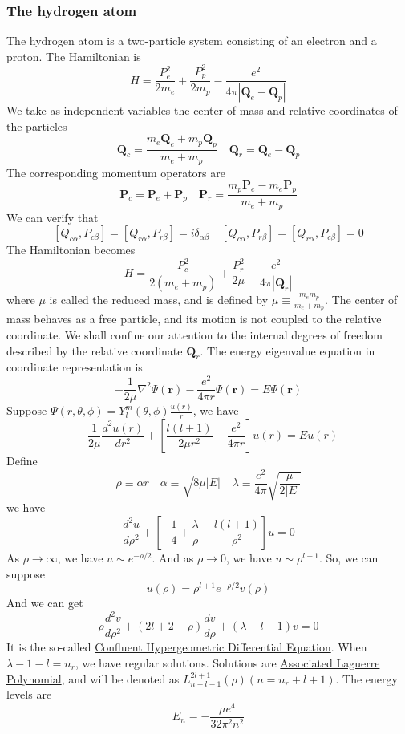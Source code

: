 \subsubsection{The hydrogen atom}
The hydrogen atom is a two-particle system consisting of an electron and a proton. The Hamiltonian is
\[H = \frac{P_e^2}{2m_e} + \frac{P_p^2}{2m_p} - \frac{e^2}{4\pi|\bm{Q}_e-\bm{Q}_p|}\]
We take as independent variables the center of mass and relative coordinates of the particles
\[\bm{Q}_c = \frac{m_e\bm{Q}_e + m_p\bm{Q}_p}{m_e+m_p} \quad \bm{Q}_r = \bm{Q}_e-\bm{Q}_p\]
The corresponding momentum operators are
\[\bm{P}_c = \bm{P}_e + \bm{P}_p \quad \bm{P}_r = \frac{m_p\bm{P}_e-m_e\bm{P}_p}{m_e + m_p}\]
We can verify that
\[[Q_{c\alpha},P_{c\beta}] = [Q_{r\alpha},P_{r\beta}] = i\delta_{\alpha\beta} \quad [Q_{c\alpha},P_{r\beta}] = [Q_{r\alpha},P_{c\beta}] = 0\]
The Hamiltonian becomes
\[H = \frac{P_c^2}{2(m_e+m_p)} + \frac{P_r^2}{2\mu} - \frac{e^2}{4\pi|\bm{Q}_r|}\]
where $\mu$ is called the reduced mass, and is defined by $\mu \equiv \frac{m_em_p}{m_e+m_p}$.
The center of mass behaves as a free particle, and its
motion is not coupled to the relative coordinate. We shall confine our attention to the internal degrees of freedom described by the relative coordinate $\bm{Q}_r$. The energy eigenvalue equation in coordinate representation is
\[-\frac{1}{2\mu}\nabla^2 \Psi(\bm{r})  -\frac{e^2}{4\pi r} \Psi(\bm{r}) = E\Psi(\bm{r})\]
Suppose $\Psi(r,\theta,\phi) = Y_l^m(\theta,\phi) \frac{u(r)}{r}$, we have
\[-\frac{1}{2\mu} \frac{d^2 u(r)}{dr^2} + \left[ \frac{l(l+1)}{2\mu r^2} - \frac{e^2}{4\pi r}\right]u(r) = Eu(r)\]
Define
\[\rho \equiv \alpha r \quad \alpha \equiv \sqrt{8\mu|E|} \quad \lambda \equiv \frac{e^2}{4\pi} \sqrt{\frac{\mu}{2|E|}}\]
we have
\[\frac{d^2 u}{d\rho^2} + \left[ -\frac{1}{4} + \frac{\lambda}{\rho} - \frac{l(l+1)}{\rho^2} \right] u = 0\]
As $\rho \to \infty$, we have $u \sim e^{-\rho/2}$. And as $\rho \to 0$, we have $u \sim \rho^{l+1}$. So, we can suppose
\[u(\rho) = \rho^{l+1} e^{-\rho/2} v(\rho)\]
And we can get
\[\rho \frac{d^2 v}{d\rho^2} + (2l+2-\rho)\frac{dv}{d\rho} + (\lambda-l-1)v = 0\]
It is the so-called \href{http://mathworld.wolfram.com/ConfluentHypergeometricDifferentialEquation.html}{Confluent Hypergeometric Differential Equation}.
When $\lambda - 1- l = n_r$, we have regular solutions. Solutions are \href{https://en.wikipedia.org/wiki/Laguerre_polynomials#Generalized_Laguerre_polynomials}{Associated Laguerre Polynomial}, and will be denoted as $L_{n-l-1}^{2l+1}(\rho) (n=n_r+l+1)$. The energy levels are
\[E_n = -\frac{\mu e^4}{32\pi^2 n^2}\]
